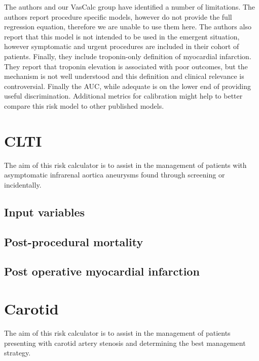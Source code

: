 \documentclass[
]{book}
\begin{document}
The authors and our VasCalc group have identified a number of limitations. The authors report procedure specific models, however do not provide the full regression equation, therefore we are unable to use them here. The authors also report that this model is not intended to be used in the emergent situation, however symptomatic and urgent procedures are included in their cohort of patients. Finally, they include troponin-only definition of myocardial infarction. They report that troponin elevation is associated with poor outcomes, but the mechanism is not well understood and this definition and clinical relevance is controversial. Finally the AUC, while adequate is on the lower end of providing useful discrimination. Additional metrics for calibration might help to better compare this risk model to other published models.

\hypertarget{clti}{%
\chapter{CLTI}\label{clti}}

The aim of this risk calculator is to assist in the management of patients with asymptomatic infrarenal aortica aneurysms found through screening or incidentally.

\hypertarget{input-variables-1}{%
\section{Input variables}\label{input-variables-1}}

\hypertarget{post-procedural-mortality}{%
\section{Post-procedural mortality}\label{post-procedural-mortality}}

\hypertarget{post-operative-myocardial-infarction}{%
\section{Post operative myocardial infarction}\label{post-operative-myocardial-infarction}}

\hypertarget{carotid}{%
\chapter{Carotid}\label{carotid}}

The aim of this risk calculator is to assist in the management of patients presenting with carotid artery stenosis and determining the best management strategy.
\end{document}
